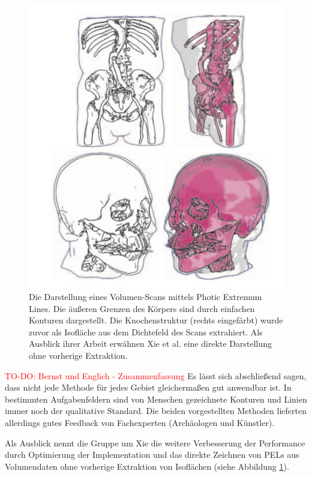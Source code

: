 \documentclass{paperStyle}
\newcommand\todo[1]{\textcolor{red}{#1}}
\begin{document}
\begin{figure}
	\centering
		\includegraphics[width=0.9\linewidth]{ausblpel.png}
	\caption{Die Darstellung eines Volumen-Scans mittels Photic Extremum Lines. Die äußeren Grenzen des Körpers sind durch einfachen Konturen dargestellt. Die Knochenstruktur (rechts eingefärbt) wurde zuvor als Isofläche aus dem Dichtefeld des Scans extrahiert. Als Ausblick ihrer Arbeit erwähnen Xie et al. eine direkte Darstellung ohne vorherige Extraktion. \cite{Xie2007}}
	\label{ausblpel}
\end{figure}
\todo{TO-DO: Bernst und Englich - Zusammenfassung}
Es lässt sich abschließend sagen, dass nicht jede Methode für jedes Gebiet gleichermaßen gut anwendbar ist. In bestimmten Aufgabenfeldern sind von Menschen gezeichnete Konturen und Linien immer noch der qualitative Standard. Die beiden vorgestellten Methoden lieferten allerdings gutes Feedback von Fachexperten (Archäologen und Künstler).

Als Ausblick nennt die Gruppe um Xie die weitere Verbesserung der Performance durch Optimierung der Implementation und das direkte Zeichnen von PELs aus Volumendaten ohne vorherige Extraktion von Isoflächen (siehe Abbildung \ref{ausblpel}). 



\end{document}
